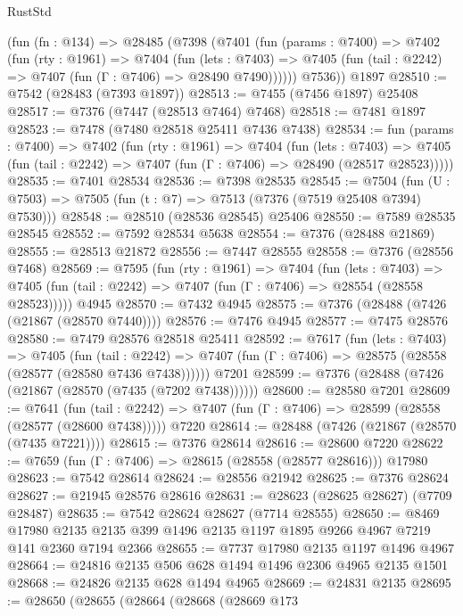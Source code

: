 \begin{lexlean}{RustStd}
\begin{coremodule}
    (fun (fn : @134) =>
    @28485
      (@7398
        (@7401
          (fun (params : @7400) =>
          @7402
            (fun (rty : @1961) =>
            @7404
              (fun (lets : @7403) =>
              @7405 (fun (tail : @2242) => @7407 (fun (Γ : @7406) => @28490 @7490))))))
        @7536))
    @1897
@28510 := @7542 (@28483 (@7393 @1897))
@28513 := @7455 (@7456 @1897) @25408
@28517 := @7376 (@7447 (@28513 @7464) @7468)
@28518 := @7481 @1897
@28523 := @7478 (@7480 @28518 @25411 @7436 @7438)
@28534 := fun (params : @7400) =>
  @7402
    (fun (rty : @1961) =>
    @7404
      (fun (lets : @7403) =>
      @7405 (fun (tail : @2242) => @7407 (fun (Γ : @7406) => @28490 (@28517 @28523)))))
@28535 := @7401 @28534
@28536 := @7398 @28535
@28545 := @7504
    (fun (U : @7503) => @7505 (fun (t : @7) => @7513 (@7376 (@7519 @25408 @7394) @7530)))
@28548 := @28510 (@28536 @28545) @25406
@28550 := @7589 @28535 @28545
@28552 := @7592 @28534 @5638
@28554 := @7376 (@28488 @21869)
@28555 := @28513 @21872
@28556 := @7447 @28555
@28558 := @7376 (@28556 @7468)
@28569 := @7595
    (fun (rty : @1961) =>
    @7404
      (fun (lets : @7403) =>
      @7405 (fun (tail : @2242) => @7407 (fun (Γ : @7406) => @28554 (@28558 @28523)))))
    @4945
@28570 := @7432 @4945
@28575 := @7376 (@28488 (@7426 (@21867 (@28570 @7440))))
@28576 := @7476 @4945
@28577 := @7475 @28576
@28580 := @7479 @28576 @28518 @25411
@28592 := @7617
    (fun (lets : @7403) =>
    @7405
      (fun (tail : @2242) =>
      @7407 (fun (Γ : @7406) => @28575 (@28558 (@28577 (@28580 @7436 @7438))))))
    @7201
@28599 := @7376 (@28488 (@7426 (@21867 (@28570 (@7435 (@7202 @7438))))))
@28600 := @28580 @7201
@28609 := @7641
    (fun (tail : @2242) => @7407 (fun (Γ : @7406) => @28599 (@28558 (@28577 (@28600 @7438)))))
    @7220
@28614 := @28488 (@7426 (@21867 (@28570 (@7435 @7221))))
@28615 := @7376 @28614
@28616 := @28600 @7220
@28622 := @7659 (fun (Γ : @7406) => @28615 (@28558 (@28577 @28616))) @17980
@28623 := @7542 @28614
@28624 := @28556 @21942
@28625 := @7376 @28624
@28627 := @21945 @28576 @28616
@28631 := @28623 (@28625 @28627) (@7709 @28487)
@28635 := @7542 @28624 @28627 (@7714 @28555)
@28650 := @8469
    @17980
    @2135
    @2135
    @399
    @1496
    @2135
    @1197
    @1895
    @9266
    @4967
    @7219
    @141
    @2360
    @7194
    @2366
@28655 := @7737 @17980 @2135 @1197 @1496 @4967
@28664 := @24816 @2135 @506 @628 @1494 @1496 @2306 @4965 @2135 @1501
@28668 := @24826 @2135 @628 @1494 @4965
@28669 := @24831 @2135
@28695 := @28650
    (@28655
      (@28664
        (@28668
          (@28669
            @173

\end{coremodule}
\end{lexlean}
